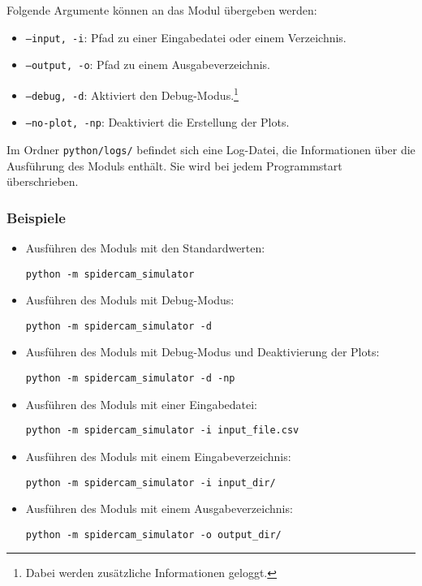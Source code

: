 Folgende Argumente können an das Modul übergeben werden:
\begin{itemize}
    \item \texttt{--input, -i}: Pfad zu einer Eingabedatei oder einem Verzeichnis.
    \item \texttt{--output, -o}: Pfad zu einem Ausgabeverzeichnis.
    \item \texttt{--debug, -d}: Aktiviert den Debug-Modus.\footnote{Dabei werden zusätzliche Informationen geloggt.}
    \item \texttt{--no-plot, -np}: Deaktiviert die Erstellung der Plots.
\end{itemize}

Im Ordner \texttt{python/logs/} befindet sich eine Log-Datei, die Informationen über die Ausführung des Moduls enthält.
Sie wird bei jedem Programmstart überschrieben.

\subsubsection{Beispiele}
\label{sssec:beispiele}

\begin{itemize}
    \item Ausführen des Moduls mit den Standardwerten:
          \begin{center}
              \texttt{python -m spidercam\_simulator}
          \end{center}
    \item Ausführen des Moduls mit Debug-Modus:
          \begin{center}
              \texttt{python -m spidercam\_simulator -d}
          \end{center}
    \item Ausführen des Moduls mit Debug-Modus und Deaktivierung der Plots:
          \begin{center}
              \texttt{python -m spidercam\_simulator -d -np}
          \end{center}
    \item Ausführen des Moduls mit einer Eingabedatei:
          \begin{center}
              \texttt{python -m spidercam\_simulator -i input\_file.csv}
          \end{center}
    \item Ausführen des Moduls mit einem Eingabeverzeichnis:
          \begin{center}
              \texttt{python -m spidercam\_simulator -i input\_dir/}
          \end{center}
    \item Ausführen des Moduls mit einem Ausgabeverzeichnis:
          \begin{center}
              \texttt{python -m spidercam\_simulator -o output\_dir/}
          \end{center}
\end{itemize}

